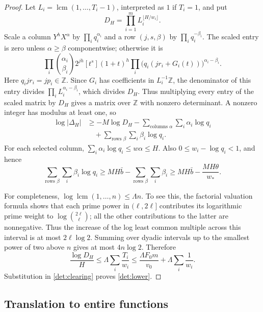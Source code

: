 \documentclass[11pt]{article}
\newcommand{\ZZ}{\mathbb Z}
\theoremstyle{definition}
\theoremstyle{remark}
\numberwithin{equation}{section}
\begin{document}
\begin{proof}
Let $L_i=\operatorname{lcm}(1,\ldots,T_i-1)$, interpreted as $1$ if
$T_i=1$, and put
\[
 D_H=\prod_{i=1}^m L_i^{\lfloor H/w_i\rfloor}.
\]
Scale a column $Y^hX^\alpha$ by $\prod_iq_i^{\alpha_i}$ and a row
$(j,s,\beta)$ by $\prod_iq_i^{-\beta_i}$.  The scaled entry is zero
unless $\alpha\ge\beta$ componentwise; otherwise it is
\[
 \prod_i\binom{\alpha_i}{\beta_i}
 2^{jh}[t^s](1+t)^h
 \prod_i\bigl(q_i(jr_i+G_i(t))\bigr)^{\alpha_i-\beta_i}.
\]
Here $q_ijr_i=jp_i\in\ZZ$.  Since $G_i$ has coefficients in
$L_i^{-1}\ZZ$, the denominator of this entry divides
$\prod_iL_i^{\alpha_i-\beta_i}$, which divides $D_H$.  Thus multiplying
every entry of the scaled matrix by $D_H$ gives a matrix over
$\ZZ$ with nonzero determinant.  A nonzero integer has
modulus at least one, so
\begin{equation}
 \begin{aligned}
 \log|\Delta_H|
 &\ge -M\log D_H
      -\sum_{\text{columns }\alpha}\sum_i\alpha_i\log q_i\\
 &\quad+\sum_{\text{rows }\beta}\sum_i\beta_i\log q_i.
 \end{aligned}
 \label{det:clearing}
\end{equation}
For each selected column, $\sum_i\alpha_i\log q_i\le w\alpha\le H$.
Also $0\le w_i-\log q_i<1$, and hence
\[
 \sum_{\text{rows }\beta}\sum_i\beta_i\log q_i
 \ge MH\bar b-\sum_{\text{rows }\beta}\sum_i\beta_i
 \ge MH\bar b-\frac{MH\theta}{w_*}.
\]

For completeness, $\log\operatorname{lcm}(1,\ldots,n)\le\Lambda n$.
To see this, the factorial valuation formula shows that each prime
power in $(\ell,2\ell]$ contributes its logarithmic prime weight to
$\log\binom{2\ell}{\ell}$; all the other contributions to the latter
are nonnegative.  Thus the increase of the log least common multiple
across this interval is at most $2\ell\log2$.  Summing over dyadic
intervals up to the smallest power of two above $n$ gives at most
$4n\log2$.  Therefore
\[
 \frac{\log D_H}{H}
 \le\Lambda\sum_i\frac{T_i}{w_i}
 \le\frac{\Lambda F_0m}{v_0}+\Lambda\sum_i\frac1{w_i}.
\]
Substitution in \eqref{det:clearing} proves \eqref{det:lower}.
\end{proof}

\subsection{Translation to entire functions}
\end{document}
